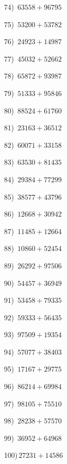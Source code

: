 \documentclass{article}
\begin{document}
\begin{multicols}{2}
74)$\,\,\,63558+96795$ \par 
75)$\,\,\,53200+53782$ \par 
76)$\,\,\,24923+14987$ \par 
77)$\,\,\,45032+52662$ \par 
78)$\,\,\,65872+93987$ \par 
79)$\,\,\,51333+95846$ \par 
80)$\,\,\,88524+61760$ \par 
81)$\,\,\,23163+36512$ \par 
82)$\,\,\,60071+33158$ \par 
83)$\,\,\,63530+81435$ \par 
84)$\,\,\,29384+77299$ \par 
85)$\,\,\,38577+43796$ \par 
86)$\,\,\,12668+30942$ \par 
87)$\,\,\,11485+12664$ \par 
88)$\,\,\,10860+52454$ \par 
89)$\,\,\,26292+97506$ \par 
90)$\,\,\,54457+36949$ \par 
91)$\,\,\,53458+79335$ \par 
92)$\,\,\,59333+56435$ \par 
93)$\,\,\,97509+19354$ \par 
94)$\,\,\,57077+38403$ \par 
95)$\,\,\,17167+29775$ \par 
96)$\,\,\,86214+69984$ \par 
97)$\,\,\,98105+75510$ \par 
98)$\,\,\,28238+57570$ \par 
99)$\,\,\,36952+64968$ \par 
100)$\,27231+14586$ \par 
\end{multicols} 
\end{document}
